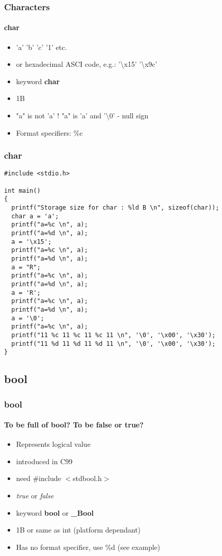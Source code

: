 \documentclass[10pt]{beamer}
\begin{document}
\begin{frame}
  \frametitle{Characters}
  \framesubtitle{char}
  \centering

    \begin{itemize}
      \item 'a' 'b' 'c' '1' etc.
      \item or hexadecimal ASCI code, e.g.: '\textbackslash x15' '\textbackslash x9c' 
      \item keyword {\bf char}
      \item 1B
      \item "a" is not 'a' !  "a" is 'a' and '\textbackslash 0' - null sign
      \item Format specifiers: \%c
    \end{itemize}

\end{frame}

\begin{frame}[fragile]
  \frametitle{char}
  \centering

    \begin{lstlisting}
#include <stdio.h>

int main()
{
  printf("Storage size for char : %ld B \n", sizeof(char));
  char a = 'a';
  printf("a=%c \n", a);
  printf("a=%d \n", a);
  a = '\x15';
  printf("a=%c \n", a);
  printf("a=%d \n", a);
  a = "R";
  printf("a=%c \n", a);
  printf("a=%d \n", a);
  a = 'R';
  printf("a=%c \n", a);
  printf("a=%d \n", a);
  a = '\0';
  printf("a=%c \n", a);
  printf("11 %c 11 %c 11 %c 11 \n", '\0', '\x00', '\x30');
  printf("11 %d 11 %d 11 %d 11 \n", '\0', '\x00', '\x30');
}
    \end{lstlisting}
\end{frame}

\subsection{bool}

\begin{frame}
  \frametitle{bool}
  \framesubtitle{To be full of bool? To be false or true?}
  \centering
    \begin{itemize}
      \item Represents logical value
      \item introduced in C99
      \item need \#include $<$stdbool.h$>$
      \item {\it true} or {\it false}
      \item keyword {\bf bool} or {\bf \_Bool}
      \item 1B or same as int (platform dependant)
      \item Has no format specifier, use \%d (see example)
    \end{itemize}

\end{frame}
\end{document}
